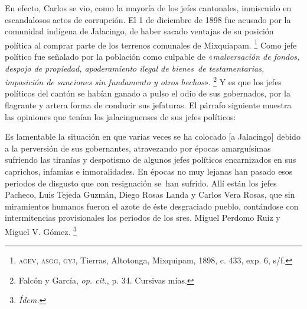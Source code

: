 \documentclass[14pt,twoside,final]{extbook} %
\let\oldfootnote\footnote
\renewcommand\footnote[1]{%
\oldfootnote{\hspace{1mm}#1}}
\begin{document}
En efecto, Carlos se vio, como la mayoría de los jefes cantonales, inmiscuido en escandalosos actos de corrupción. El 1 de diciembre de 1898 fue acusado por la comunidad indígena de Jalacingo, de haber sacado ventajas de su posición política al comprar parte de los terrenos comunales de Mixquiapam.\footnote{\textsc{agev, asgg, gyj}, Tierras, Altotonga, Mixquipam, 1898, c. 433, exp. 6, s/f.} Como jefe político fue señalado por la población como culpable de «\emph{malversación de fondos, despojo de propiedad, apoderamiento ilegal de bienes~de testamentarias, imposición de sanciones sin fundamento y otros hechos}».\footnote{Falcón y García, \emph{op. cit.}, p. 34. Cursivas mías.} Y es que los jefes políticos del cantón se habían ganado a pulso el odio de sus gobernados, por la flagrante y artera forma de conducir sus jefaturas. El párrafo siguiente muestra las opiniones que tenían los jalacinguenses de sus jefes políticos:
\begin{quoting}
Es lamentable la situación en que varias veces se ha colocado [a Jalacingo] debido a la perversión de sus gobernantes, atravezando por épocas amarguísimas sufriendo las tiranías y despotismo de algunos jefes políticos encarnizados en sus caprichos, infamias e inmoralidades. En épocas no muy lejanas han pasado esos periodos de disgusto que con resignación se~han sufrido. Allí están los jefes Pacheco, Luis Tejeda Guzmán, Diego Rosas Landa y Carlos Vera Rosas, que sin miramientos humanos fueron el azote de éste desgraciado pueblo, contándose con intermitencias provisionales los periodos de los sres. Miguel Perdomo Ruiz y Miguel V. Gómez.\footnote{\em Ídem.}
\end{quoting}
\end{document}
